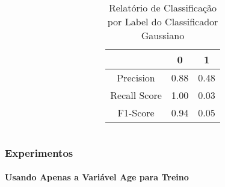 \documentclass{beamer}
\begin{document}
\begin{frame}
\begin{columns}
\begin{column}{0.5\textwidth}
\begin{table}[H]
\begin{small}
\begin{tabular}{ccc}
                            \hline
                        \end{tabular}
                    \end{small}
                \end{table}
            \end{column}
            \begin{column}{0.5\textwidth}
                \begin{table}[H]

                    \centering
                    \caption{\label{tab:cr2-gnb} Relatório de Classificação por Label do Classificador Gaussiano}
                    \begin{small}
                        \begin{tabular}{ccc}
                        
                            \hline
                                                    & 0                & 1\\
                            \hline
                            Precision               & 0.88             & 0.48\\
                            Recall Score            & 1.00             & 0.03\\
                            F1-Score                & 0.94             & 0.05\\
                            
                            \hline
                        \end{tabular}
                    \end{small}
                
                \end{table}
            \end{column}
            \end{columns}    
    \end{frame}
    
\begin{frame}
    \frametitle{Experimentos}
    \framesubtitle{Usando Apenas a Variável Age para Treino}
    
\end{frame}
\end{document}
